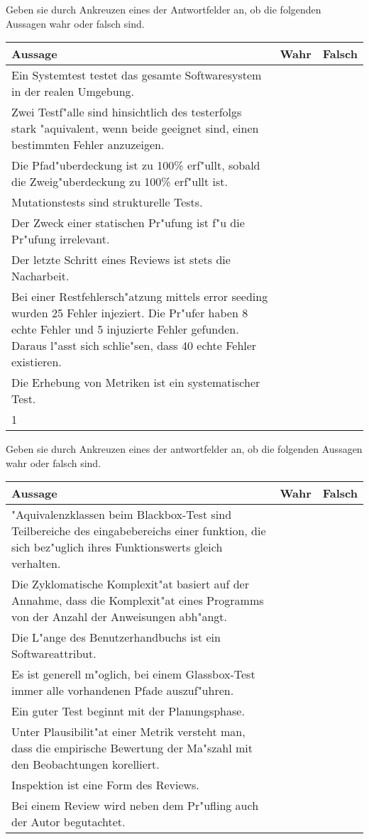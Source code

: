\documentclass[12pt]{exam}
\begin{document}
\begin{questions}
\question[8] Geben sie durch Ankreuzen eines der Antwortfelder an, ob die folgenden Aussagen wahr oder falsch sind.
\addpoints
\begin{tabular}{| p{12cm} | c | c |} \hline
    Aussage & Wahr & Falsch \\ \hline
    Ein Systemtest testet das gesamte Softwaresystem in der realen Umgebung. & & \\ \hline
    Zwei Testf"alle sind hinsichtlich des testerfolgs stark "aquivalent, wenn beide geeignet sind, einen bestimmten Fehler anzuzeigen. & & \\ \hline
    Die Pfad"uberdeckung ist zu 100\% erf"ullt, sobald die Zweig"uberdeckung zu 100\% erf"ullt ist. & & \\ \hline
    Mutationstests sind strukturelle Tests. & & \\ \hline
    Der Zweck einer statischen Pr"ufung ist f"u die Pr"ufung irrelevant. & & \\ \hline
    Der letzte Schritt eines Reviews ist stets die Nacharbeit. & & \\ \hline
    Bei einer Restfehlersch"atzung mittels error seeding wurden 25 Fehler injeziert. Die Pr"ufer haben 8 echte Fehler und 5 injuzierte Fehler gefunden. Daraus l"asst sich schlie"sen, dass 40 echte Fehler existieren. & & \\ \hline
    Die Erhebung von Metriken ist ein systematischer Test. & & \\ \hline1
\end{tabular}

\question[8] Geben sie durch Ankreuzen eines der antwortfelder an, ob die folgenden Aussagen wahr oder falsch sind.
\addpoints
\begin{tabular}{| p{12cm} | c | c |} \hline
    Aussage & Wahr & Falsch \\ \hline
    "Aquivalenzklassen beim Blackbox-Test sind Teilbereiche des eingabebereichs einer funktion, die sich bez"uglich ihres Funktionswerts gleich verhalten. & & \\ \hline
    Die Zyklomatische Komplexit"at basiert auf der Annahme, dass die Komplexit"at eines Programms von der Anzahl der Anweisungen abh"angt. & & \\ \hline
    Die L"ange des Benutzerhandbuchs ist ein Softwareattribut. & & \\ \hline
    Es ist generell m"oglich, bei einem Glassbox-Test immer alle vorhandenen Pfade auszuf"uhren. & & \\ \hline
    Ein guter Test beginnt mit der Planungsphase. & & \\ \hline
    Unter Plausibilit"at einer Metrik versteht man, dass die empirische Bewertung der Ma"szahl mit den Beobachtungen korelliert. & & \\ \hline
    Inspektion ist eine Form des Reviews. & & \\ \hline
    Bei einem Review wird neben dem Pr"ufling auch der Autor begutachtet. & & \\ \hline
\end{tabular}


\end{questions}
\end{document}
